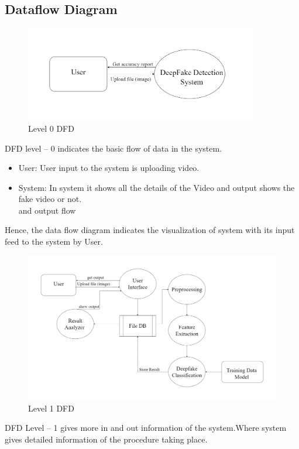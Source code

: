 
\subsection{Dataflow Diagram}
\begin{figure}[h]
    \centering
    \includegraphics[width= 4in ]{img/level0dfd.drawio.png}
    \caption{Level 0 DFD}
\end{figure}

\justify
DFD level – 0 indicates the basic flow of data in the system.
\begin{itemize}
    \item User: User input to the system is uploading video.
    \item System: In system it shows all the details of the Video and output shows the fake video or not. \\
          and output flow
\end{itemize}
Hence, the data flow diagram indicates the visualization of system with its input feed to the system by User.\\
\begin{figure}[h]
    \centering
    \includegraphics[width= 6in ]{img/level1dfd.drawio.png}
    \caption{Level 1 DFD}
\end{figure}
\justify
DFD Level – 1 gives more in and out information of the system.Where system gives detailed information of the procedure taking place.

